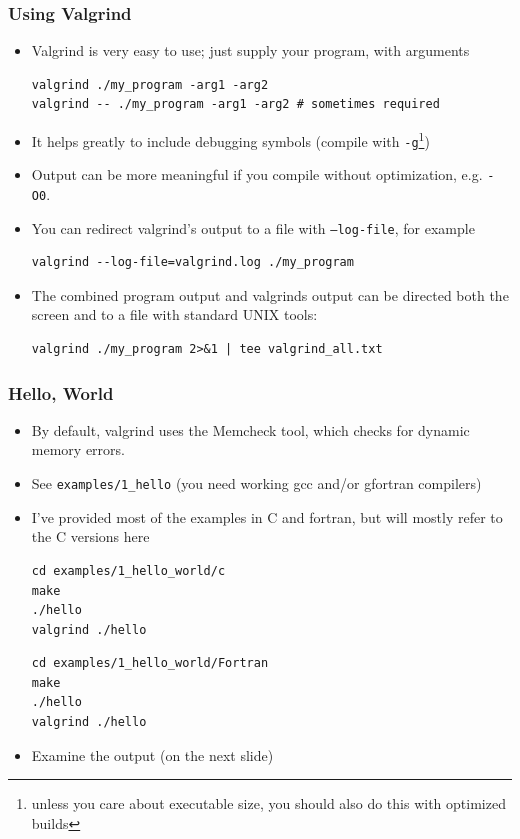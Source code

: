\documentclass{beamer}
\begin{document}
\begin{frame}[fragile]
\frametitle{Using Valgrind}
\begin{itemize}
\item Valgrind is very easy to use; just supply your program, with arguments
\begin{lstlisting}
valgrind ./my_program -arg1 -arg2
valgrind -- ./my_program -arg1 -arg2 # sometimes required
\end{lstlisting}
\item It helps greatly to include debugging symbols (compile with \texttt{-g}\footnote{unless you care about executable size, you should also do this with optimized builds})
\item Output can be more meaningful if you compile without optimization, e.g. \texttt{-O0}.
\item You can redirect valgrind's output to a file with \texttt{--log-file}, for example
  \begin{lstlisting}
valgrind --log-file=valgrind.log ./my_program
  \end{lstlisting}
\item The combined program output and valgrinds output can be directed both the screen and to a file with standard UNIX tools:
  \begin{lstlisting}
valgrind ./my_program 2>&1 | tee valgrind_all.txt
  \end{lstlisting}
\end{itemize}
\end{frame}

\begin{frame}[fragile]
\frametitle{Hello, World}
\begin{itemize}
\item By default, valgrind uses the Memcheck tool, which checks for dynamic memory errors.
\item See \texttt{examples/1\_hello} (you need working gcc and/or gfortran compilers)
  \item I've provided most of the examples in C and fortran, but will mostly refer to the C versions here
\begin{lstlisting}
cd examples/1_hello_world/c
make
./hello
valgrind ./hello
\end{lstlisting}
\begin{lstlisting}
cd examples/1_hello_world/Fortran
make
./hello
valgrind ./hello
\end{lstlisting}
\item Examine the output (on the next slide)
\end{itemize}
\end{frame}
\end{document}
